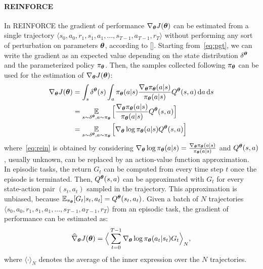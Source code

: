 \paragraph{REINFORCE} \label{subsec:rein}
In REINFORCE the gradient of performance $\nabla_{\boldsymbol{\theta}}J(\boldsymbol{\theta})$ can be estimated from a single trajectory $\langle s_0, a_0, r_1, s_1, a_1, ..., s_{T-1}, a_{T-1}, r_{T} \rangle$ without performing any sort of perturbation on parameters $\boldsymbol{\theta}$, according to [\cite{Williams1992SimpleSG}]. Starting from~\eqref{eq:pgt}, we can write the gradient as an expected value depending on the state distribution $\delta^{\boldsymbol{\theta}}$ and the parameterized policy $\pi_{\boldsymbol{\theta}}$. Then, the samples collected following $\pi_{\boldsymbol{\theta}}$ can be used for the estimation of $\nabla_{\boldsymbol{\theta}}J(\boldsymbol{\theta})$: 
\begin{align}
\nabla_{\boldsymbol{\theta}}J(\boldsymbol{\theta}) &= \int_s \delta^{\boldsymbol{\theta}}(s) \int_a \pi_{\boldsymbol{\theta}}(a|s) \frac{\nabla_{\boldsymbol{\theta}} \pi_{\boldsymbol{\theta}}(a|s)}{\pi_{\boldsymbol{\theta}}(a|s)} Q^{\boldsymbol{\theta}}(s,a) \,\mathrm{d} a \,\mathrm{d} s \nonumber\\
&= \operatorname*{\mathbb{E}}_{s \sim \delta^{\boldsymbol{\theta}}, a \sim \pi_{\boldsymbol{\theta}}} \Big[ \frac{\nabla_{\boldsymbol{\theta}} \pi_{\boldsymbol{\theta}}(a|s)}{\pi_{\boldsymbol{\theta}}(a|s)} Q^{\boldsymbol{\theta}}(s,a) \Big] \nonumber\\
&= \operatorname*{\mathbb{E}}_{s \sim \delta^{\boldsymbol{\theta}}, a \sim \pi_{\boldsymbol{\theta}}} \Big[ \nabla_{\boldsymbol{\theta}} \log\pi_{\boldsymbol{\theta}}(a|s) Q^{\boldsymbol{\theta}}(s,a) \Big] \label{eq:rein}
\end{align}
where~\eqref{eq:rein} is obtained by considering $\nabla_{\boldsymbol{\theta}} \log\pi_{\boldsymbol{\theta}}(a|s) = \frac{\nabla_{\boldsymbol{\theta}} \pi_{\boldsymbol{\theta}}(a|s)}{\pi_{\boldsymbol{\theta}}(a|s)}$ and $Q^{\boldsymbol{\theta}}(s, a)$, usually unknown, can be replaced by an action-value function approximation.\\
\newline
In episodic tasks, the return $G_t$ can be computed from every time step $t$ once the episode is terminated. Then, $Q^{\boldsymbol{\theta}}(s, a)$ can be approximated with $G_{t}$ for every state-action pair $(s_t, a_t)$ sampled in the trajectory. This approximation is unbiased, because $\operatorname*{\mathbb{E}}_{\pi_{\boldsymbol{\theta}}}[G_t | s_t, a_t] = Q^{\boldsymbol{\theta}}(s_t, a_t)$.
Given a batch of $N$ trajectories $\langle s_0, a_0, r_1, s_1, a_1, ..., s_{T-1}, a_{T-1}, r_{T} \rangle$ from an episodic task, the gradient of performance can be estimated as:
\begin{align}
	\widehat{\nabla}_{\boldsymbol{\theta}}J(\boldsymbol{\theta}) = \Big\langle \sum_{t=0}^{T-1} \nabla_{\boldsymbol{\theta}} \log\pi_{\boldsymbol{\theta}}(a_t|s_t) G_{t} \Big\rangle_{N}, \label{eq:estrein}
\end{align}
where $\langle \cdot \rangle_{N}$ denotes the average of the inner expression over the $N$ trajectories.\\
